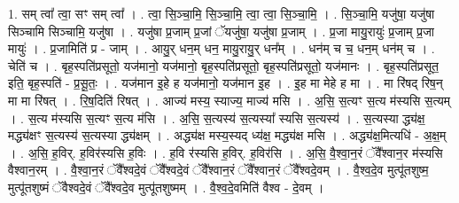 \documentclass[17pt]{extarticle}
\begin{document}
1. सम् त्वा᳚ त्वा॒ सꣳ सम् त्वा᳚ । . त्वा॒ सि॒ञ्चा॒मि॒ सि॒ञ्चा॒मि॒ त्वा॒ त्वा॒ सि॒ञ्चा॒मि॒ । . सि॒ञ्चा॒मि॒ यजु॑षा॒ यजु॑षा सिञ्चामि सिञ्चामि॒ यजु॑षा । . यजु॑षा प्र॒जाम् प्र॒जां ॅयजु॑षा॒ यजु॑षा प्र॒जाम् । . प्र॒जा मायु॒रायुः॑ प्र॒जाम् प्र॒जा मायुः॑ । . प्र॒जामिति॑ प्र - जाम् । . आयु॒र् धन॒म् धन॒ मायु॒रायु॒र् धन᳚म् । . धन॑म् च च॒ धन॒म् धन॑म् च । . चेति॑ च । . बृह॒स्पति॑प्रसूतो॒ यज॑मानो॒ यज॑मानो॒ बृह॒स्पति॑प्रसूतो॒ बृह॒स्पति॑प्रसूतो॒ यज॑मानः । . बृह॒स्पति॑प्रसूत॒ इति॒ बृह॒स्पति॑ - प्र॒सू॒तः॒ । . यज॑मान इ॒हे ह यज॑मानो॒ यज॑मान इ॒ह । . इ॒ह मा मेहे ह मा । . मा रि॑षद् रिष॒न् मा मा रि॑षत् । . रि॒ष॒दिति॑ रिषत् । . आज्य॑ मस्य॒ स्याज्य॒ माज्य॑ मसि । . अ॒सि॒ स॒त्यꣳ स॒त्य म॑स्यसि स॒त्यम् । . स॒त्य म॑स्यसि स॒त्यꣳ स॒त्य म॑सि । . अ॒सि॒ स॒त्यस्य॑ स॒त्यस्या᳚ स्यसि स॒त्यस्य॑ । . स॒त्यस्या द्ध्य॑क्ष॒ मद्ध्य॑क्षꣳ स॒त्यस्य॑ स॒त्यस्या द्ध्य॑क्षम् । . अद्ध्य॑क्ष मस्य॒स्यद् ध्य॑क्ष॒ मद्ध्य॑क्ष मसि । . अद्ध्य॑क्ष॒मित्यधि॑ - अ॒क्ष॒म् । . अ॒सि॒ ह॒विर्. ह॒विर॑स्यसि ह॒विः । . ह॒वि र॑स्यसि ह॒विर्. ह॒विर॑सि । . अ॒सि॒ वै॒श्वा॒न॒रं ॅवै᳚श्वान॒र म॑स्यसि वैश्वान॒रम् । . वै॒श्वा॒न॒रं ॅवै᳚श्वदे॒वं ॅवै᳚श्वदे॒वं ॅवै᳚श्वान॒रं ॅवै᳚श्वान॒रं ॅवै᳚श्वदे॒वम् । . वै॒श्व॒दे॒व मुत्पू॑तशुष्म॒ मुत्पू॑तशुष्मं ॅवैश्वदे॒वं ॅवै᳚श्वदे॒व मुत्पू॑तशुष्मम् । . वै॒श्व॒दे॒वमिति॑ वैश्व - दे॒वम् । \newline
\end{document}
